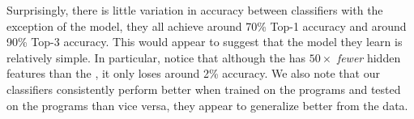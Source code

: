 Surprisingly, there is little variation in accuracy between classifiers
with the exception of the \linear model, they all achieve around 70\%
Top-1 accuracy and around 90\% Top-3 accuracy.
%
This would appear to suggest that the model they learn is relatively
simple.
%
In particular, notice that although the \hiddenT has $50\times$ \emph{fewer}
hidden features than the \hiddenFH, it only loses around 2\% accuracy.
%
We also note that our classifiers consistently perform better when
trained on the \FALL programs and tested on the \SPRING programs than
vice versa, they appear to generalize better from the \FALL data.
